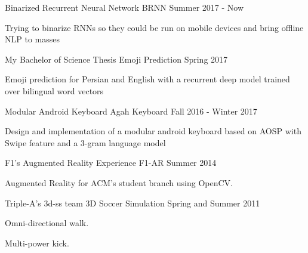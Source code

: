 

\begin{cventries}

\cventry
    {Binarized Recurrent Neural Network} %
    {BRNN} %
    {} %
    {Summer 2017 - Now} %
    {
      \begin{cvitems} %
        \item {Trying to binarize RNNs so they could be run on mobile devices and bring offline NLP to masses}
      \end{cvitems}
    }

\cventry
    {My Bachelor of Science Thesis} %
    {Emoji Prediction} %
    {} %
    {Spring 2017} %
    {
      \begin{cvitems} %
        \item {Emoji prediction for Persian and English with a recurrent deep model trained over bilingual word vectors}
      \end{cvitems}
    }

\cventry
    {Modular Android Keyboard} %
    {Agah Keyboard} %
    {} %
    {Fall 2016 - Winter 2017} %
    {
      \begin{cvitems} %
        \item {Design and implementation of a modular android keyboard based on AOSP with Swipe feature and a 3-gram language model}
      \end{cvitems}
    }

  \cventry
    {F1’s Augmented Reality Experience} %
    {F1-AR} %
    {} %
    {Summer 2014} %
    {
      \begin{cvitems} %
        \item {Augmented Reality for ACM's student branch using OpenCV.}
      \end{cvitems}
    }
    
  \cventry
    {Triple-A's 3d-ss team} %
    {3D Soccer Simulation} %
    {} %
    {Spring and Summer 2011} %
    {
      \begin{cvitems} %
        \item {Omni-directional walk.}
        \item {Multi-power kick.}
      \end{cvitems}
    }
    

\end{cventries}
